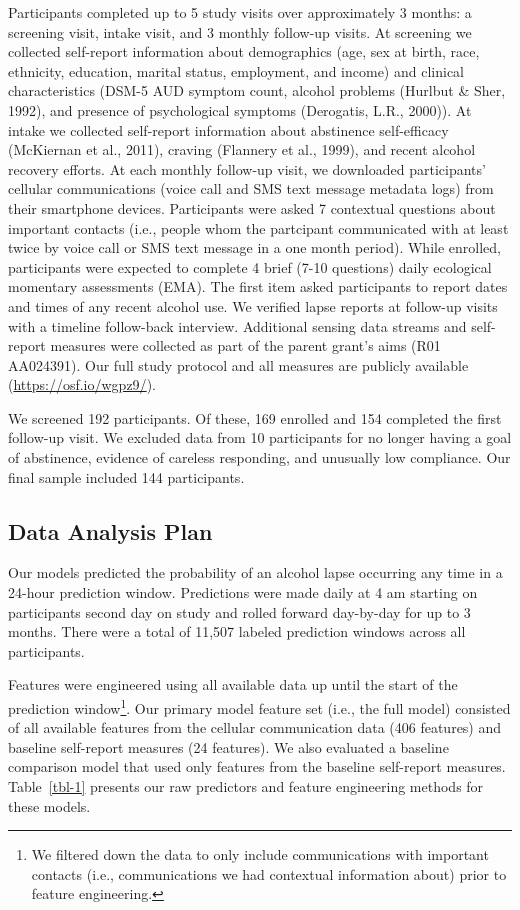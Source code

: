 \documentclass[
  letterpaper,
  DIV=11,
  numbers=noendperiod]{scrartcl}
\begin{document}
Participants completed up to 5 study visits over approximately 3 months:
a screening visit, intake visit, and 3 monthly follow-up visits. At
screening we collected self-report information about demographics (age,
sex at birth, race, ethnicity, education, marital status, employment,
and income) and clinical characteristics (DSM-5 AUD symptom count,
alcohol problems (Hurlbut \& Sher, 1992), and presence of psychological
symptoms (Derogatis, L.R., 2000)). At intake we collected self-report
information about abstinence self-efficacy (McKiernan et al., 2011),
craving (Flannery et al., 1999), and recent alcohol recovery efforts. At
each monthly follow-up visit, we downloaded participants' cellular
communications (voice call and SMS text message metadata logs) from
their smartphone devices. Participants were asked 7 contextual questions
about important contacts (i.e., people whom the partcipant communicated
with at least twice by voice call or SMS text message in a one month
period). While enrolled, participants were expected to complete 4 brief
(7-10 questions) daily ecological momentary assessments (EMA). The first
item asked participants to report dates and times of any recent alcohol
use. We verified lapse reports at follow-up visits with a timeline
follow-back interview. Additional sensing data streams and self-report
measures were collected as part of the parent grant's aims (R01
AA024391). Our full study protocol and all measures are publicly
available (\url{https://osf.io/wgpz9/}).

We screened 192 participants. Of these, 169 enrolled and 154 completed
the first follow-up visit. We excluded data from 10 participants for no
longer having a goal of abstinence, evidence of careless responding, and
unusually low compliance. Our final sample included 144 participants.

\subsection{Data Analysis Plan}\label{data-analysis-plan}

Our models predicted the probability of an alcohol lapse occurring any
time in a 24-hour prediction window. Predictions were made daily at 4 am
starting on participants second day on study and rolled forward
day-by-day for up to 3 months. There were a total of 11,507 labeled
prediction windows across all participants.

Features were engineered using all available data up until the start of
the prediction window\footnote{We filtered down the data to only include
  communications with important contacts (i.e., communications we had
  contextual information about) prior to feature engineering.}. Our
primary model feature set (i.e., the full model) consisted of all
available features from the cellular communication data (406 features)
and baseline self-report measures (24 features). We also evaluated a
baseline comparison model that used only features from the baseline
self-report measures. Table~\ref{tbl-1} presents our raw predictors and
feature engineering methods for these models.
\end{document}
